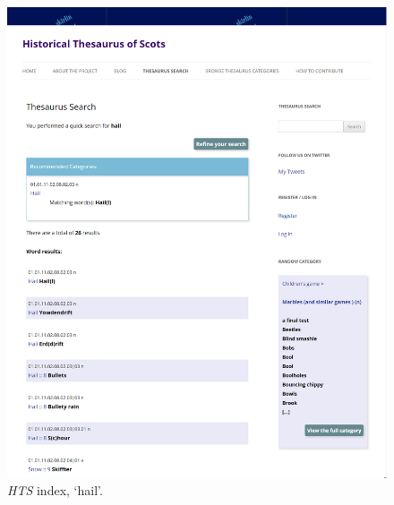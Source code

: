 \begin{figure}[htbp]
  \centering
    \includegraphics[width=\linewidth]{Stolk_thes-content/fig/thes/HTS-index-hail.png}
  \caption{\textit{HTS} index, `hail'.}
  \label{fig:1.A:HTS:index}
\end{figure}



